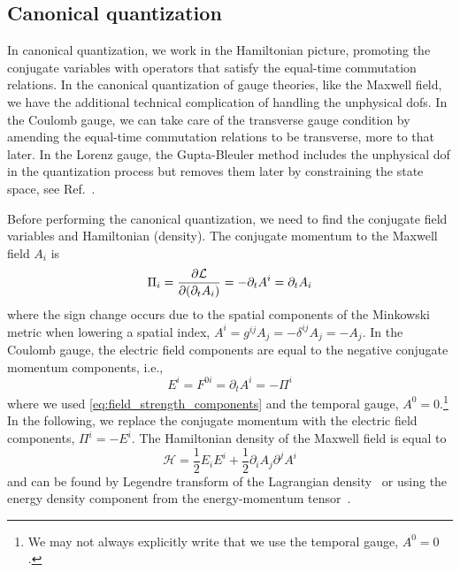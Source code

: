 \subsection{Canonical quantization}

In canonical quantization, we work in the Hamiltonian picture, promoting the conjugate variables with operators that satisfy the equal-time commutation relations.
In the canonical quantization of gauge theories, like the Maxwell field, we have the additional technical complication of handling the unphysical \gls{dof}s.
In the Coulomb gauge, we can take care of the transverse gauge condition by amending the equal-time commutation relations to be transverse, more to that later.
In the Lorenz gauge, the Gupta-Bleuler method includes the unphysical \gls{dof} in the quantization process but removes them later by constraining the state space, see Ref.~\cite[p.~180]{Greiner2013}.

Before performing the canonical quantization, we need to find the conjugate field variables and Hamiltonian (density).
The conjugate momentum to the Maxwell field $A_i$ is~\cite[p.~342]{Srednicki2007}
\begin{equation}
	\Pi_i
	=
	\pdv{\mathcal{L}}{(\partial_t A_i)}
	=
	-
	\partial_t A^i
	=
	\partial_t A_i
	\label{eq:maxwell_conjugate_momentum}
\end{equation}
where the sign change occurs due to the spatial components of the Minkowski metric when lowering a spatial index, $A^i=g^{ij}A_j=-\delta^{ij}A_j=-A_j$.
In the Coulomb gauge, the electric field components are equal to the negative conjugate momentum components, i.e.,
\begin{equation}
	E^i
	=
	F^{0i}
	=
	\partial_t A^i
	=
	-
	\Pi^i
\end{equation}
where we used \cref{eq:field_strength_components} and the temporal gauge, $A^0=0$.\footnote{We may not always explicitly write that we use the temporal gauge, $A^0=0$.}
In the following, we replace the conjugate momentum with the electric field components, $\Pi^i=-E^i$.
The Hamiltonian density of the Maxwell field is equal to
\begin{equation}
	\mathcal{H}
	=
	\frac{1}{2}
	E_i E^i
	+
	\frac{1}{2}
	\partial_i A_j
	\partial^j A^i
	\label{eq:maxwell_hamiltonian}
\end{equation}
and can be found by Legendre transform of the Lagrangian density~\cite[p.~342]{Srednicki2007} or using the energy density component from the energy-momentum tensor~\cite[p.~148]{Greiner2013}.

